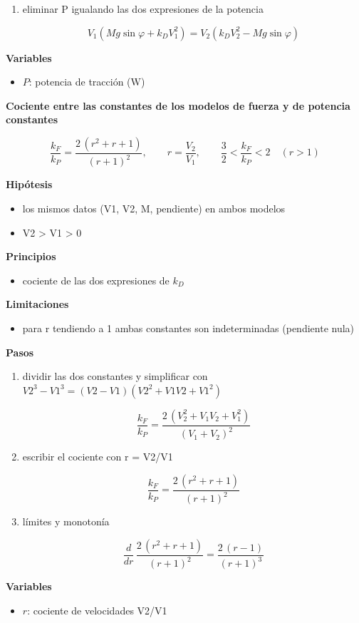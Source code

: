 \documentclass[10pt,openany]{book}
\begin{document}
\begin{tcolorbox}[title={Desarrollos del modelo}, studiumdef, breakable]
\begin{enumerate}
\[
\frac{P}{V_2} + Mg\sin\varphi = k_D V_2^{2}
\]
\item
eliminar P igualando las dos expresiones de la potencia

\[
V_1\left(Mg\sin\varphi + k_D V_1^{2}\right) = V_2\left(k_D V_2^{2} - Mg\sin\varphi\right)
\]
\end{enumerate}

\noindent\textbf{Variables}
\begin{itemize}
\item $P$: potencia de tracción ($\mathrm{W}$)
\end{itemize}



\noindent\textbf{Cociente entre las constantes de los modelos de fuerza y de potencia constantes}

\begin{equation}
\frac{k_F}{k_P} = \frac{2\,(r^{2} + r + 1)}{(r + 1)^{2}},\qquad r = \frac{V_2}{V_1},\qquad \frac{3}{2} < \frac{k_F}{k_P} < 2\quad (r > 1)
\label{eq:c01-cociente-modelos}
\end{equation}

\noindent\textbf{Hipótesis}
\begin{itemize}
\item los mismos datos (V1, V2, M, pendiente) en ambos modelos
\item V2 > V1 > 0
\end{itemize}

\noindent\textbf{Principios}
\begin{itemize}
\item cociente de las dos expresiones de \(k_D\)
\end{itemize}

\noindent\textbf{Limitaciones}
\begin{itemize}
\item para r tendiendo a 1 ambas constantes son indeterminadas (pendiente nula)
\end{itemize}

\noindent\textbf{Pasos}
\begin{enumerate}
\item
dividir las dos constantes y simplificar con \(V2^3 - V1^3 = (V2 - V1)(V2^2 + V1 V2 + V1^2)\)

\[
\frac{k_F}{k_P} = \frac{2\,(V_2^{2} + V_1 V_2 + V_1^{2})}{(V_1 + V_2)^{2}}
\]
\item
escribir el cociente con r = V2/V1

\[
\frac{k_F}{k_P} = \frac{2\,(r^{2} + r + 1)}{(r + 1)^{2}}
\]
\item
límites y monotonía

\[
\frac{d}{dr}\,\frac{2\,(r^{2} + r + 1)}{(r + 1)^{2}} = \frac{2\,(r - 1)}{(r + 1)^{3}}
\]
\end{enumerate}

\noindent\textbf{Variables}
\begin{itemize}
\item $r$: cociente de velocidades V2/V1
\end{itemize}


\end{tcolorbox}
\end{document}
